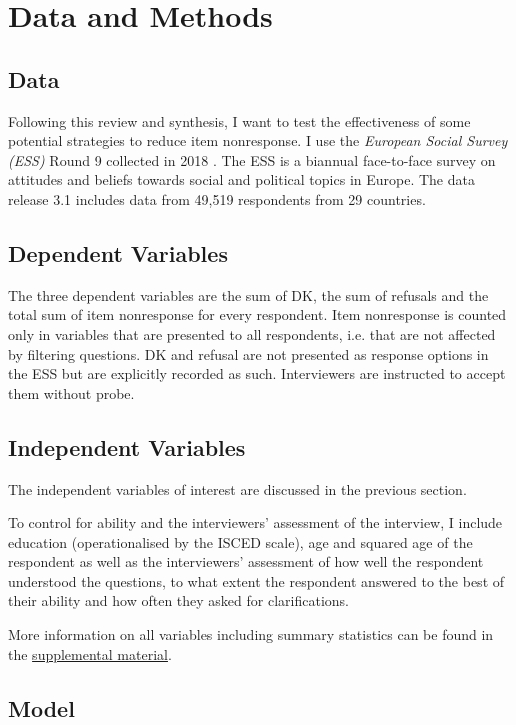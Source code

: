 \documentclass[a4paper,12pt]{article}
\begin{document}
\section{Data and Methods}

\subsection{Data}

Following this review and synthesis, I want to test the effectiveness of some potential strategies to reduce item nonresponse. I use the \textit{European Social Survey (ESS)} Round 9 collected in 2018 \citep{essericEuropeanSocialSurvey2019}. The ESS is a biannual face-to-face survey on attitudes and beliefs towards social and political topics in Europe. The data release 3.1 includes data from 49,519 respondents from 29 countries.

\subsection{Dependent Variables}

The three dependent variables are the sum of DK, the sum of refusals and the total sum of item nonresponse for every respondent. Item nonresponse is counted only in variables that are presented to all respondents, i.e. that are not affected by filtering questions. DK and refusal are not presented as response options in the ESS but are explicitly recorded as such. Interviewers are instructed to accept them without probe.

\subsection{Independent Variables}

The independent variables of interest are discussed in the previous section.

To control for ability and the interviewers' assessment of the interview, I include education (operationalised by the ISCED scale), age and squared age of the respondent as well as the interviewers' assessment of how well the respondent understood the questions, to what extent the respondent answered to the best of their ability and how often they asked for clarifications.

More information on all variables including summary statistics can be found in the \href{https://doi.org/10.17605/OSF.IO/M83GY
}{supplemental material}.

\subsection{Model}
\end{document}
